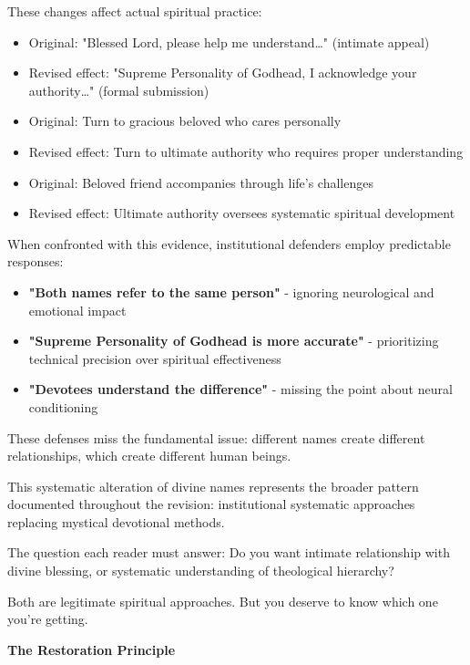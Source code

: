 \documentclass[12pt,twoside]{book}
\begin{document}
These changes affect actual spiritual practice:

\begin{itemize}
\item Original: "Blessed Lord, please help me understand\ldots{}" (intimate appeal)
\item Revised effect: "Supreme Personality of Godhead, I acknowledge your authority\ldots{}" (formal submission)

\item Original: Turn to gracious beloved who cares personally
\item Revised effect: Turn to ultimate authority who requires proper understanding

\item Original: Beloved friend accompanies through life's challenges
\item Revised effect: Ultimate authority oversees systematic spiritual development
\end{itemize}

When confronted with this evidence, institutional defenders employ predictable responses:

\begin{itemize}
\item \textbf{\textbf{"Both names refer to the same person"}} - ignoring neurological and emotional impact
\item \textbf{\textbf{"Supreme Personality of Godhead is more accurate"}} - prioritizing technical precision over spiritual effectiveness
\item \textbf{\textbf{"Devotees understand the difference"}} - missing the point about neural conditioning
\end{itemize}

These defenses miss the fundamental issue: different names create different relationships, which create different human beings.

This systematic alteration of divine names represents the broader pattern documented throughout the revision: institutional systematic approaches replacing mystical devotional methods.

The question each reader must answer: Do you want intimate relationship with divine blessing, or systematic understanding of theological hierarchy?

Both are legitimate spiritual approaches. But you deserve to know which one you're getting.



\vspace{0.5cm}
\textbf{The Restoration Principle}
\vspace{0.2cm}
\end{document}

